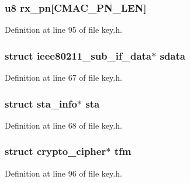 \hypertarget{structieee80211__key_af268ed760198a17a7ecd9c352f6f1fc5}{
\subsubsection[{rx\-\_\-pn}]{\setlength{\rightskip}{0pt plus 5cm}u8 rx\-\_\-pn\mbox{[}{\bf C\-M\-A\-C\-\_\-\-P\-N\-\_\-\-L\-E\-N}\mbox{]}}}\label{structieee80211__key_af268ed760198a17a7ecd9c352f6f1fc5}


Definition at line 95 of file key.\-h.

\hypertarget{structieee80211__key_ad829d8d33f06a7245cc303f924f259ac}{
\subsubsection[{sdata}]{\setlength{\rightskip}{0pt plus 5cm}struct {\bf ieee80211\-\_\-sub\-\_\-if\-\_\-data}$\ast$ sdata}}\label{structieee80211__key_ad829d8d33f06a7245cc303f924f259ac}


Definition at line 67 of file key.\-h.

\hypertarget{structieee80211__key_aafa9dadbeccd54b4a6b9f77f2908a093}{
\subsubsection[{sta}]{\setlength{\rightskip}{0pt plus 5cm}struct {\bf sta\-\_\-info}$\ast$ sta}}\label{structieee80211__key_aafa9dadbeccd54b4a6b9f77f2908a093}


Definition at line 68 of file key.\-h.

\hypertarget{structieee80211__key_a45576ea98555983d71e70badb9035f67}{
\subsubsection[{tfm}]{\setlength{\rightskip}{0pt plus 5cm}struct crypto\-\_\-cipher$\ast$ tfm}}\label{structieee80211__key_a45576ea98555983d71e70badb9035f67}


Definition at line 96 of file key.\-h.

